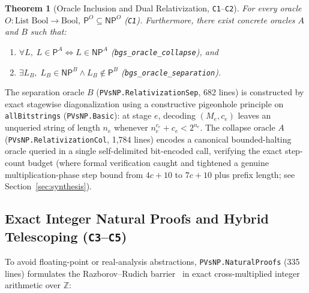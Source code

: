 \documentclass[11pt,reqno]{amsart}
\newcommand{\code}[1]{\texttt{\nolinkurl{#1}}}
\newtheorem{theorem}{Theorem}[section]
\theoremstyle{definition}
\newcommand{\Z}{\mathbb{Z}}
\newcommand{\PP}{\mathsf{P}}
\newcommand{\NP}{\mathsf{NP}}
\begin{document}
\begin{theorem}[Oracle Inclusion and Dual Relativization, \texttt{C1}--\texttt{C2}]
\label{thm:bgs}
For every oracle $O : \mathrm{List}\;\mathrm{Bool} \to \mathrm{Bool}$,
$\PP^O \subseteq \NP^O$ (\texttt{C1}). Furthermore, there exist concrete oracles $A$ and
$B$ such that:
\begin{enumerate}[leftmargin=1.6em]
\item $\forall L,\; L \in \PP^A \iff L \in \NP^A$ (\code{bgs_oracle_collapse}), and
\item $\exists L_B,\; L_B \in \NP^B \wedge L_B \notin \PP^B$ (\code{bgs_oracle_separation}).
\end{enumerate}
\end{theorem}

The separation oracle $B$ (\code{PVsNP.RelativizationSep}, 682 lines) is constructed by
exact stagewise diagonalization using a constructive pigeonhole principle on
\texttt{allBitstrings} (\code{PVsNP.Basic}): at stage $e$, decoding $(M_e, c_e)$ leaves
an unqueried string of length $n_e$ whenever $n_e^{c_e} + c_e < 2^{n_e}$. The collapse
oracle $A$ (\code{PVsNP.RelativizationCol}, 1,784 lines) encodes a canonical
bounded-halting oracle queried in a single self-delimited bit-encoded call, verifying the
exact step-count budget (where formal verification caught and tightened a genuine
multiplication-phase step bound from $4c + 10$ to $7c + 10$ plus prefix length; see
Section~\ref{sec:synthesis}).

\subsection{Exact Integer Natural Proofs and Hybrid Telescoping (\texttt{C3}--\texttt{C5})}
To avoid floating-point or real-analysis abstractions, \code{PVsNP.NaturalProofs}
(335 lines) formulates the Razborov--Rudich barrier~\cite{RazborovRudich1997} in exact
cross-multiplied integer arithmetic over $\Z$:
\end{document}
